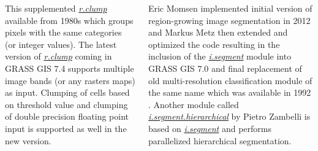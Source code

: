 \documentclass[25pt, margin=0mm, innermargin=15mm, blockverticalspace=15mm, colspace=15mm, subcolspace=8mm]{tikzposter}
\newcommand{\gmodule}[1]{\href{http://grass.osgeo.org/grass72/manuals/#1.html}{\emph{#1}}}
\newcommand{\gamodule}[1]{\href{http://grass.osgeo.org/grass72/manuals/addons/#1.html}{\emph{#1}}}
\begin{document}
\begin{columns}
{This supplemented \gmodule{r.clump} available from 1980s
which groups pixels with the same categories (or integer values).
The latest version of \gmodule{r.clump} coming in GRASS GIS 7.4
supports multiple image bands (or any rasters maps) as input.
Clumping of cells based on threshold value and clumping
of double precision floating point input is supported as well in the new version.

Eric Momsen implemented initial version of region-growing image segmentation in 2012
and Markus Metz then extended and optimized the code resulting in
the inclusion of the \gmodule{i.segment} module into GRASS GIS 7.0
and final replacement of old multi-resolution classification module of the same name
which was available in 1992 \citep{zhuang1992image}.
Another module called \gamodule{i.segment.hierarchical} by Pietro Zambelli is based on \gmodule{i.segment}
and performs parallelized hierarchical segmentation.

\vspace*{0.7cm}

}
\end{columns}
\end{document}
